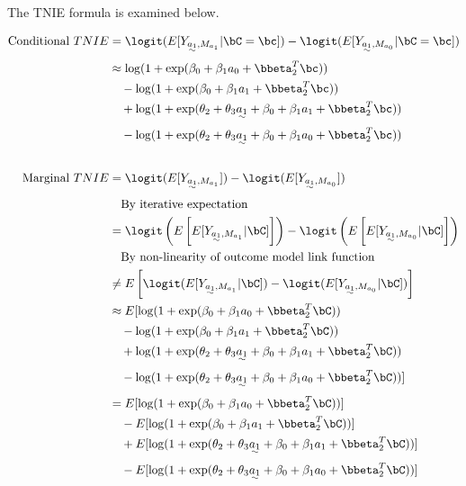 \documentclass[dvipdfmx,10pt]{article}
\begin{document}
The TNIE formula is examined below.

\begin{align*}
  \text{Conditional }TNIE
  &= \logit(E[Y_{\uwave{a_{1}},M_{a_{1}}} | \bC = \bc]) - \logit(E[Y_{\uwave{a_{1}},M_{a_{0}}} | \bC = \bc])\\
  &\approx \log(1 + \exp(\beta_{0} + \beta_{1} a_{0} + \bbeta_{2}^T\bc))\\
  &~~~ - \log(1 + \exp(\beta_{0} + \beta_{1} a_{1} + \bbeta_{2}^T\bc))\\
  &~~~ + \log(1 + \exp(\theta_{2} + \theta_{3}\uwave{a_{1}} + \beta_{0} + \beta_{1} a_{1} + \bbeta_{2}^T\bc))\\
  &~~~ - \log(1 + \exp(\theta_{2} + \theta_{3}\uwave{a_{1}} + \beta_{0} + \beta_{1} a_{0} + \bbeta_{2}^T\bc))\\
  \\
  \text{Marginal }TNIE
  &= \logit(E[Y_{\uwave{a_{1}},M_{a_{1}}}]) - \logit(E[Y_{\uwave{a_{1}},M_{a_{0}}}])\\
  &~~~\text{By iterative expectation}\\
  &= \logit\left(E\left[E[Y_{\uwave{a_{1}},M_{a_{1}}} | \bC]\right]\right) - \logit\left(E\left[E[Y_{\uwave{a_{1}},M_{a_{0}}} | \bC]\right]\right)\\
  &~~~\text{By non-linearity of outcome model link function}\\
  &\ne E \left[ \logit(E[Y_{\uwave{a_{1}},M_{a_{1}}} | \bC]) - \logit(E[Y_{\uwave{a_{1}},M_{a_{0}}} | \bC]) \right]\\
  &\approx E[\log(1 + \exp(\beta_{0} + \beta_{1} a_{0} + \bbeta_{2}^T\bC))\\
  &~~~ - \log(1 + \exp(\beta_{0} + \beta_{1} a_{1} + \bbeta_{2}^T\bC))\\
  &~~~ + \log(1 + \exp(\theta_{2} + \theta_{3}\uwave{a_{1}} + \beta_{0} + \beta_{1} a_{1} + \bbeta_{2}^T\bC))\\
  &~~~ - \log(1 + \exp(\theta_{2} + \theta_{3}\uwave{a_{1}} + \beta_{0} + \beta_{1} a_{0} + \bbeta_{2}^T\bC))]\\
  &=     E[\log(1 + \exp(\beta_{0} + \beta_{1} a_{0} + \bbeta_{2}^T\bC))]\\
  &~~~ - E[\log(1 + \exp(\beta_{0} + \beta_{1} a_{1} + \bbeta_{2}^T\bC))]\\
  &~~~ + E[\log(1 + \exp(\theta_{2} + \theta_{3}\uwave{a_{1}} + \beta_{0} + \beta_{1} a_{1} + \bbeta_{2}^T\bC))]\\
  &~~~ - E[\log(1 + \exp(\theta_{2} + \theta_{3}\uwave{a_{1}} + \beta_{0} + \beta_{1} a_{0} + \bbeta_{2}^T\bC))]\\

\end{align*}
\end{document}
